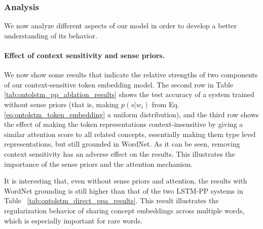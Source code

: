 \subsubsection{Analysis}
\label{sec:ontolstm_pp_analysis}
We now analyze different aspects of our model in order to develop a better understanding of its behavior.

\paragraph{Effect of context sensitivity and sense priors.} We now show some results that indicate the relative strengths of two components of our context-sensitive token embedding model. The second row in Table \ref{tab:ontolstm_pp_ablation_results} shows the test accuracy of a system trained without sense priors (that is, making $p(s|w_i)$ from Eq. \ref{eq:ontolstm_token_embedding} a uniform distribution), and the third row shows the effect of making the token representations context-insensitive by giving a similar attention score to all related concepts, essentially making them type level representations, but still grounded in WordNet. As it can be seen, removing context sensitivity has an adverse effect on the results.
This illustrates the importance of the sense priors and the attention mechanism.

It is interesting that, even without sense priors and attention, the results with WordNet grounding is still higher than that of the two LSTM-PP systems in Table ~\ref{tab:ontolstm_direct_ppa_results}.
This result illustrates the regularization behavior of sharing concept embeddings across multiple words, which is especially important for rare words.

